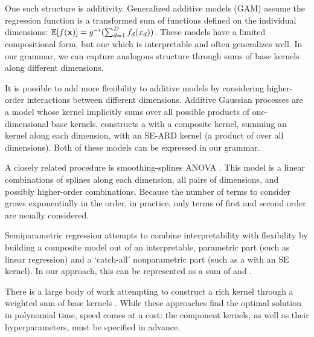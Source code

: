One such structure is additivity.
Generalized additive models (GAM) assume the regression function is a transformed sum of functions defined on the individual dimensions: $\expect[f(\vx)] = g\inv(\sum_{d=1}^D f_d(x_d))$.
These models have a limited compositional form, but one which is interpretable and often generalizes well.
In our grammar, we can capture analogous structure through sums of base kernels along different dimensions.

It is possible to add more flexibility to additive models by considering higher-order interactions between different dimensions. 
Additive Gaussian processes \cite{duvenaud2011additive11} are a \gp{} model whose kernel implicitly sums over all possible products of one-dimensional base kernels.  
\citet{plate1999accuracy} constructs a \gp{} with a composite kernel, summing an \kSE{} kernel along each dimension, with an SE-ARD kernel (\ie a product of \kSE{} over all dimensions).
Both of these models can be expressed in our grammar.

A closely related procedure is smoothing-splines ANOVA \cite{wahba1990spline, gu2002smoothing}.
This model is a linear combinations of splines along each dimension, all pairs of dimensions, and possibly higher-order combinations.
Because the number of terms to consider grows exponentially in the order, in practice, only terms of first and second order are usually considered.

Semiparametric regression \citep[e.g.][]{ruppert2003semiparametric} attempts to combine interpretability with flexibility by building  a composite model out of an interpretable, parametric part (such as linear regression) and a `catch-all' nonparametric part (such as a \gp{} with an SE kernel).
In our approach, this can be represented as a sum of \kSE{} and \kLin{}.

There is a large body of work attempting to construct a rich kernel through a weighted sum of base kernels \citep[e.g.][]{christoudias2009bayesian, Bach_HKL}.
While these approaches find the optimal solution in polynomial time, speed comes at a cost: the component kernels, as well as their hyperparameters, must be specified in advance.

